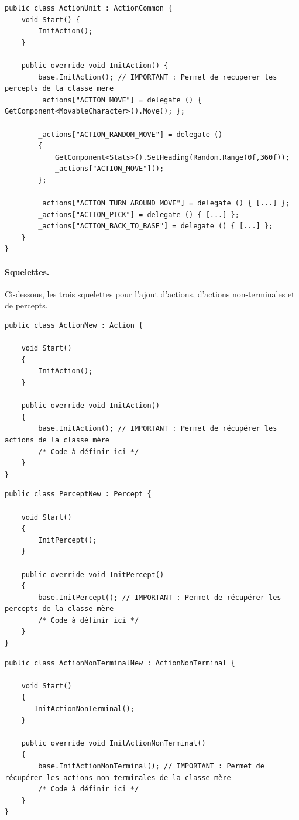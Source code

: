 \documentclass{report}
\begin{document}
 \begin{lstlisting}[language={[Sharp]C},label={lst:ActionUnit2Script}, caption= Code de ActionUnit.cs]
public class ActionUnit : ActionCommon {
    void Start() {
        InitAction();
    }
    
    public override void InitAction() {
        base.InitAction(); // IMPORTANT : Permet de recuperer les percepts de la classe mere
        _actions["ACTION_MOVE"] = delegate () { GetComponent<MovableCharacter>().Move(); };
        
        _actions["ACTION_RANDOM_MOVE"] = delegate ()
        {
            GetComponent<Stats>().SetHeading(Random.Range(0f,360f));
            _actions["ACTION_MOVE"]();
        };
   
        _actions["ACTION_TURN_AROUND_MOVE"] = delegate () { [...] };
        _actions["ACTION_PICK"] = delegate () { [...] };
        _actions["ACTION_BACK_TO_BASE"] = delegate () { [...] };
    }
}
\end{lstlisting}


\paragraph{Squelettes.}Ci-dessous, les trois squelettes pour l'ajout d'actions, d'actions non-terminales et de percepts.
 \begin{lstlisting}[language={[Sharp]C},label={lst:ActionNewScript}, caption= Structure du code d'une nouvelle classe d'action.]
public class ActionNew : Action {

    void Start() 
    {
        InitAction();
    }
    
    public override void InitAction() 
    {
        base.InitAction(); // IMPORTANT : Permet de récupérer les actions de la classe mère
        /* Code à définir ici */
    }
}
\end{lstlisting}

 \begin{lstlisting}[language={[Sharp]C},label={lst:PerceptNewScript}, caption= Structure du code d'une nouvelle classe de percepts.]
public class PerceptNew : Percept {

    void Start() 
    {
        InitPercept();
    }
    
    public override void InitPercept() 
    {
        base.InitPercept(); // IMPORTANT : Permet de récupérer les percepts de la classe mère
        /* Code à définir ici */
    }
}
\end{lstlisting}

 \begin{lstlisting}[language={[Sharp]C},label={lst:ActionNonTerminalNewScript}, caption= Structure du code d'une nouvelle classe d'action non-terminale.]
public class ActionNonTerminalNew : ActionNonTerminal {

    void Start() 
    {
       InitActionNonTerminal();
    }
    
    public override void InitActionNonTerminal()
    {
        base.InitActionNonTerminal(); // IMPORTANT : Permet de récupérer les actions non-terminales de la classe mère
        /* Code à définir ici */
    }
}
\end{lstlisting}
\end{document}
